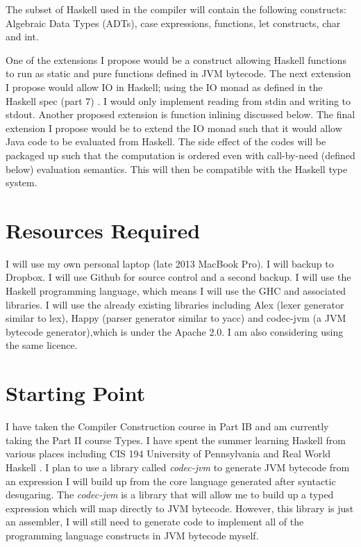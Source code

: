 \documentclass[12pt,a4paper,twoside]{article}
\begin{document}
  The subset of Haskell used in the compiler will contain the following constructs: Algebraic Data Types (ADTs), case expressions,
  functions, let constructs, char and int.

  One of the extensions I propose would be a construct allowing Haskell functions to run as static and pure functions defined in JVM bytecode.
  The next extension I propose would allow IO in Haskell; using the IO monad as defined in the Haskell spec (part 7) \cite{haskell98-spec}.
  I would only implement reading from stdin and writing to stdout. Another proposed extension is function inlining discussed below.
  The final extension I propose would be to extend the IO monad such that it would allow Java code to be evaluated from Haskell. The side effect of the codes
  will be packaged  up such that the computation is ordered even with call-by-need (defined below) evaluation semantics.
  This will then be compatible with the Haskell type system.

\section*{Resources Required}
  I will use my own personal laptop (late 2013 MacBook Pro).
  I will backup to Dropbox.
  I will use Github for source control and a second backup.
  I will use the Haskell programming language, which means I will use the GHC and associated libraries.
  I will use the already existing libraries including Alex (lexer generator similar to lex),
  Happy (parser generator similar to yacc) and codec-jvm (a JVM bytecode generator),which is under the Apache 2.0. I am also considering using the same licence.

\section*{Starting Point}
  I have taken the Compiler Construction course in Part IB and am currently taking the Part II course Types. I have spent the summer
  learning Haskell from various places including CIS 194 University of Pennsylvania \cite{cis194} and Real World Haskell \cite{realwordhaskell}.
  I plan to use a library called \textit{codec-jvm} to generate JVM bytecode from an expression I will build up from the core language generated after
  syntactic desugaring. The \textit{codec-jvm} is a library that will allow me to build up a typed expression which will map directly
  to JVM bytecode. However, this library is just an assembler, I will still need to generate code to implement all of the
  programming language constructs in JVM bytecode myself.
\end{document}
